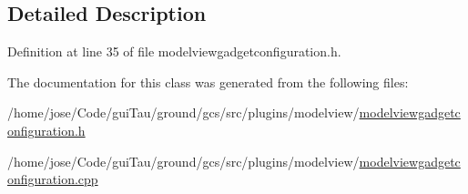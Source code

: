 \subsection{Detailed Description}


Definition at line 35 of file modelviewgadgetconfiguration.\-h.



The documentation for this class was generated from the following files\-:\begin{DoxyCompactItemize}
\item 
/home/jose/\-Code/gui\-Tau/ground/gcs/src/plugins/modelview/\hyperlink{modelviewgadgetconfiguration_8h}{modelviewgadgetconfiguration.\-h}\item 
/home/jose/\-Code/gui\-Tau/ground/gcs/src/plugins/modelview/\hyperlink{modelviewgadgetconfiguration_8cpp}{modelviewgadgetconfiguration.\-cpp}\end{DoxyCompactItemize}
